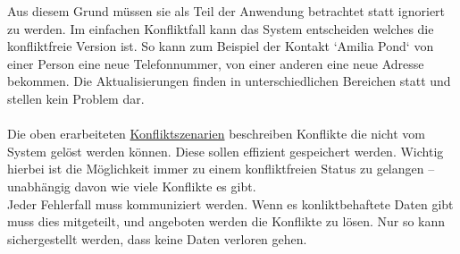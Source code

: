Aus diesem Grund müssen sie als Teil der Anwendung betrachtet statt ignoriert zu werden.
Im einfachen Konfliktfall kann das System entscheiden welches die konfliktfreie Version ist. So kann zum Beispiel der Kontakt `Amilia Pond` von einer Person eine neue Telefonnummer, von einer anderen eine neue Adresse bekommen.
Die Aktualisierungen finden in unterschiedlichen Bereichen statt und stellen kein Problem dar. \\\\
Die oben erarbeiteten \hyperref[sec:konfliktszenarien]{Konfliktszenarien} beschreiben Konflikte die nicht vom System gelöst werden können.
Diese sollen effizient gespeichert werden. Wichtig hierbei ist die Möglichkeit immer zu einem konfliktfreien Status zu gelangen -- unabhängig davon wie viele Konflikte es gibt.\\
Jeder Fehlerfall muss kommuniziert werden. Wenn es konliktbehaftete Daten gibt muss dies mitgeteilt, und angeboten werden die Konflikte zu lösen. Nur so kann sichergestellt werden, dass keine Daten verloren gehen.
